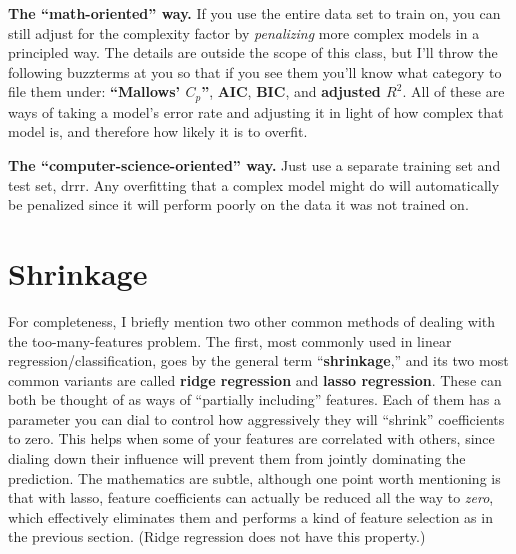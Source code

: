 \begin{compactitem}



\item \textbf{The ``math-oriented'' way.} If you use the entire data set to
train on, you can still adjust for the complexity factor by \textit{penalizing}
more complex models in a principled way. The details are outside the scope of
this class, but I'll throw the following buzzterms at you so that if you see
them you'll know what category to file them under: \textbf{``Mallows' $C_p$''},
\textbf{AIC}, \textbf{BIC}, and \textbf{adjusted $R^2$}. All of these are ways
of taking a model's error rate and adjusting it in light of how complex that
model is, and therefore how likely it is to overfit.

\item \textbf{The ``computer-science-oriented'' way.} Just use a separate
training set and test set, drrr. Any overfitting that a complex model might do
will automatically be penalized since it will perform poorly on the data it was
not trained on.

\end{compactitem}

\section{Shrinkage}


For completeness, I briefly mention two other common methods of dealing with
the too-many-features problem. The first, most commonly used in linear
regression/classification, goes by the general term ``\textbf{shrinkage},'' and
its two most common variants are called \textbf{ridge regression} and
\textbf{lasso regression}. These can both be thought of as ways of ``partially
including'' features. Each of them has a parameter you can dial to control how
aggressively they will ``shrink'' coefficients to zero. This helps when some of
your features are correlated with others, since dialing down their influence
will prevent them from jointly dominating the prediction. The mathematics are
subtle, although one point worth mentioning is that with lasso, feature
coefficients can actually be reduced all the way to \textit{zero}, which
effectively eliminates them and performs a kind of feature selection as in the
previous section. (Ridge regression does not have this property.)

